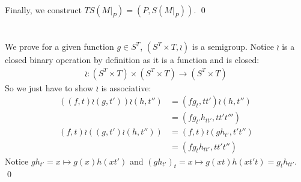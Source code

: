 \documentclass[a4paper,12pt,numbers=noenddot]{scrreport}
\begin{document}
Finally, we construct $TS(M|_P) = (P, S(M|_P))$.
\qed
\section{}
\section{}
We prove for a given function $g \in S^T$, $(S^T \times T, \wr)$ is a semigroup.
Notice $\wr$ is a closed binary operation by definition as it is a function and is closed:
\begin{align*}
    \wr: (S^T \times T) \times (S^T \times T) \rightarrow (S^T \times T)
\end{align*}
So we just have to show $\wr$ is associative:
\begin{align*}
    ((f,t) \wr (g, t')) \wr (h, t'') &= (fg_{t}, tt') \wr (h, t'') \\
                                     &= (fg_{t'}h_{tt'}, tt't''') \\
    (f,t) \wr ((g,t') \wr (h, t'')) &= (f,t) \wr (gh_{t'}, t't'') \\
                                    &= (fg_{t}h_{tt'}, tt't'')
\end{align*}
Notice $gh_{t'} = x \mapsto g(x)h(xt')$ and $(gh_{t'})_t = x \mapsto g(xt)h(xt't) = g_th_{tt'}$.
\qed
\end{document}

